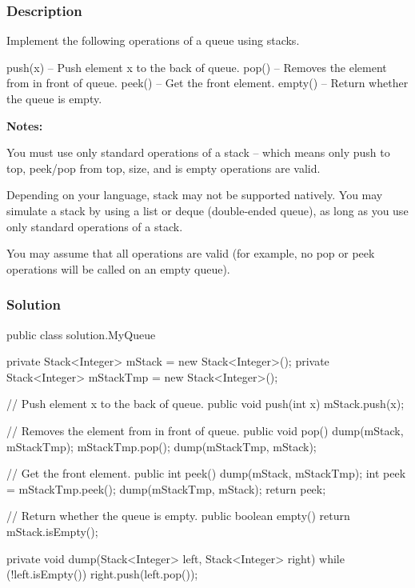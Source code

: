 \subsubsection{Description}
Implement the following operations of a queue using stacks.
\begin{Code}
push(x) -- Push element x to the back of queue.
pop() -- Removes the element from in front of queue.
peek() -- Get the front element.
empty() -- Return whether the queue is empty.
\end{Code}

\textbf{Notes:}

You must use only standard operations of a stack -- which means only push to top, peek/pop from top, size, and is empty operations are valid.

Depending on your language, stack may not be supported natively. You may simulate a stack by using a list or deque (double-ended queue), as long as you use only standard operations of a stack.

You may assume that all operations are valid (for example, no pop or peek operations will be called on an empty queue).

\subsubsection{Solution}

\begin{Code}
public class solution.MyQueue {
    private Stack<Integer> mStack = new Stack<Integer>();
    private Stack<Integer> mStackTmp = new Stack<Integer>();

    // Push element x to the back of queue.
    public void push(int x) {
        mStack.push(x);
    }

    // Removes the element from in front of queue.
    public void pop() {
        dump(mStack, mStackTmp);
        mStackTmp.pop();
        dump(mStackTmp, mStack);
    }

    // Get the front element.
    public int peek() {
        dump(mStack, mStackTmp);
        int peek = mStackTmp.peek();
        dump(mStackTmp, mStack);
        return peek;
    }

    // Return whether the queue is empty.
    public boolean empty() {
        return mStack.isEmpty();
    }

    private void dump(Stack<Integer> left, Stack<Integer> right) {
        while (!left.isEmpty()) {
            right.push(left.pop());
        }
    }
}

\end{Code}

